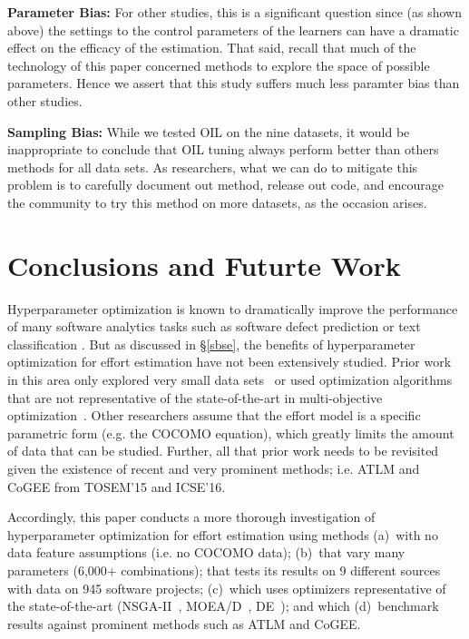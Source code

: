  \textbf{Parameter Bias:} For other studies, this is a significant question
 since (as shown above) the settings to the control parameters of the learners
 can have a dramatic effect on the efficacy of the estimation.
 That said, 
 recall that much of the technology of this paper concerned methods to explore
 the space of possible parameters.
 Hence we assert that 
 this study suffers much less paramter bias than other studies.
 


\textbf{Sampling Bias:} While we tested OIL on the nine datasets, it would be inappropriate to conclude that OIL tuning  always perform better than
others methods for all data sets.
As researchers, what we can do to mitigate this problem is to carefully document out method, release out code,
and encourage the community to try this method on more datasets, as the occasion arises.


\section{Conclusions and Futurte Work} \label{sect:conclusion}

Hyperparameter optimization is known to dramatically improve the performance of many software analytics tasks such as software defect prediction or 
 text classification \cite{Fu2016TuningFS,tanti18,AGRAWAL2018,agrawal2017better}.
But as discussed in   \S\ref{sbse}, the  benefits of      hyperparameter  optimization for   effort estimation 
have not been extensively
studied.
Prior work in this area only explored very small data sets~\cite{li09} or used
optimization
  algorithms that are not representative of  the state-of-the-art in multi-objective optimization~\cite{li09,dejaeger12,Song:2013}.
Other researchers assume that the effort model is a specific parametric form (e.g. the COCOMO equation), which greatly limits the amount of data that can be studied.
Further, all that prior work needs to be revisited given the existence of recent and very prominent
methods; i.e. ATLM and CoGEE from TOSEM'15 and ICSE'16\cite{Whigham:2015,sarro2016multi}.

Accordingly, this paper conducts a  more thorough investigation of     hyperparameter   optimization for effort estimation
using methods (a)~with no   data
feature assumptions (i.e. no COCOMO data);
(b)~that
 vary
many  parameters (6,000+ combinations);
that    tests  its results   on 9 different sources with data on 945 software projects; 
(c)~which  uses optimizers   representative of the  state-of-the-art 
(NSGA-II~\cite{deb02}, MOEA/D~\cite{Zhang07}, DE~\cite{storn1997differential});
and which 
(d)~benchmark results 
against  prominent methods such as 
  ATLM and CoGEE.

